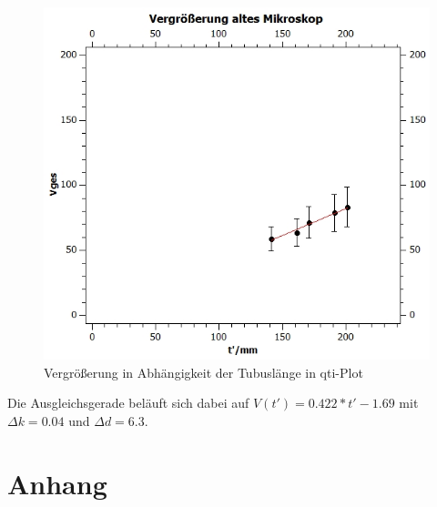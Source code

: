\documentclass[12pt,a4paper,twoside]{article}
\begin{document}
\begin{figure}[H]
    \centering
    \includegraphics[width=0.6\linewidth, angle=0]{nudes/VergrößerungAltesMik.jpg}
    \caption{Vergrößerung in Abhängigkeit der Tubuslänge in qti-Plot}
    \label{fig:VergrößerungDiagramm}
\end{figure}

\noindent Die Ausgleichsgerade beläuft sich dabei auf $V(t') = 0.422*t' - 1.69$ mit $\Delta k = 0.04$ und $\Delta d = 6.3$.

\printbibliography[heading=bibintoc]

\section{Anhang} %
\end{document}
